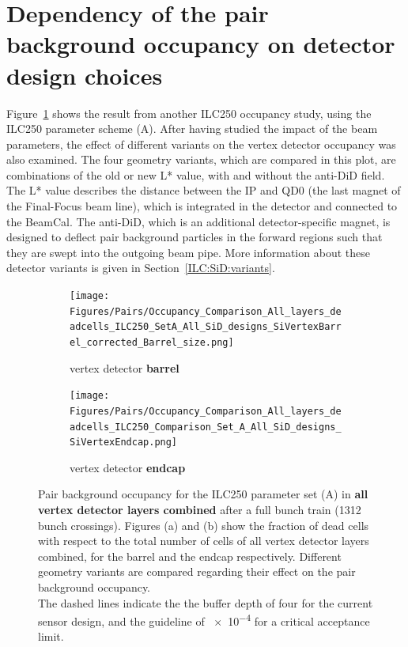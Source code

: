 \section{Dependency of the pair background occupancy on detector design choices}
\label{PairBkg:SiD_design}
Figure~\ref{fig:PairBkg:ILC250_Occupancy_SetA} shows the result from another ILC250 occupancy study, using the ILC250 parameter scheme (A).
After having studied the impact of the beam parameters, the effect of different \sid variants on the vertex detector occupancy was also examined.
The four geometry variants, which are compared in this plot, are combinations of the old or new L* value, with and without the \sid anti-DiD field.
The L* value describes the distance between the IP and QD0 (the last magnet of the Final-Focus beam line), which is integrated in the detector and connected to the BeamCal.
The anti-DiD, which is an additional detector-specific magnet, is designed to deflect pair background particles in the forward regions such that they are swept into the outgoing beam pipe.
More information about these detector variants is given in Section~\ref{ILC:SiD:variants}.
 \begin{figure}[!h]
 \centering
   \begin{subfigure}[b]{0.49\textwidth}
   \centering
    \texttt{[image: Figures/Pairs/Occupancy\_Comparison\_All\_layers\_deadcells\_ILC250\_SetA\_All\_SiD\_designs\_SiVertexBarrel\_corrected\_Barrel\_size.png]}
       \caption{\sid vertex detector \textbf{barrel}}
   \end{subfigure}
   \hfill
    \begin{subfigure}[b]{0.49\textwidth}
   \centering
    \texttt{[image: Figures/Pairs/Occupancy\_Comparison\_All\_layers\_deadcells\_ILC250\_Comparison\_Set\_A\_All\_SiD\_designs\_SiVertexEndcap.png]}
       \caption{\sid vertex detector \textbf{endcap}}
   \end{subfigure}
   \caption[Pair background occupancy in the \sid vertex detector for the ILC250 set (A) for different \sid geometry variants]{Pair background occupancy for the ILC250 parameter set (A) in \textbf{all \sid vertex detector layers combined} after a full bunch train (\num{1312} bunch crossings).
   Figures (a) and (b) show the fraction of dead cells with respect to the total number of cells of all vertex detector layers combined, for the barrel and the endcap respectively.
   Different \sid geometry variants are compared regarding their effect on the pair background occupancy.
   \\The dashed lines indicate the the buffer depth of four for the current sensor design, and the guideline of \num{e-4} for a critical acceptance limit.
   }
   \label{fig:PairBkg:ILC250_Occupancy_SetA}
 \end{figure}
